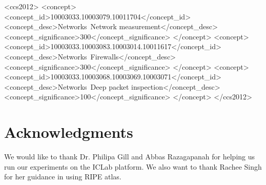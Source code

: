 \documentclass{sig-alternate-05-2015}
\begin{document}
\maketitle



%
%
\begin{CCSXML}
<ccs2012>
<concept>
<concept_id>10003033.10003079.10011704</concept_id>
<concept_desc>Networks~Network measurement</concept_desc>
<concept_significance>300</concept_significance>
</concept>
<concept>
<concept_id>10003033.10003083.10003014.10011617</concept_id>
<concept_desc>Networks~Firewalls</concept_desc>
<concept_significance>300</concept_significance>
</concept>
<concept>
<concept_id>10003033.10003068.10003069.10003071</concept_id>
<concept_desc>Networks~Deep packet inspection</concept_desc>
<concept_significance>100</concept_significance>
</concept>
</ccs2012>
\end{CCSXML}


%
%

%
%
\printccsdesc









\section{Acknowledgments}
We would like to thank Dr. Philipa Gill and Abbas Razagapanah for helping us run our experiments on the ICLab platform. We also want to thank Rachee Singh for her guidance in using RIPE atlas.

%

\end{document}
